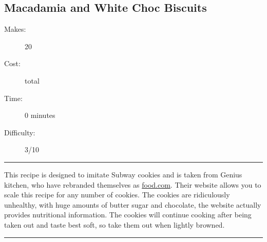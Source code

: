 \documentclass[]{article}
\begin{document}
\subsection*{\center\huge Macadamia and White Choc Biscuits}
\begin{description}
\item[Makes:] 20 
\item[Cost:]  total
\item[Time:] 0 minutes
\item[Difficulty:] 3/10
\end{description}
\vspace{0.2cm}\hrule\vspace{0.5cm}
\begin{adjustwidth}{0.5 cm}{0.5 cm}

This recipe is designed to imitate Subway cookies and is taken from Genius kitchen, who have rebranded themselves as \href{https://www.food.com/recipe/subway-white-chocolate-macadamia-nut-cookies-389301?mode=US&scaleto=48}{food.com}. Their website allows you to scale this recipe for any number of cookies. The cookies are ridiculously unhealthy, with huge amounts of butter sugar and chocolate, the website actually provides nutritional information. The cookies will continue cooking after being taken out and taste best soft, so take them out when lightly browned. \hfill{}\color{black}

\end{adjustwidth}
\vspace{0.5cm}\hrule
\end{document}
